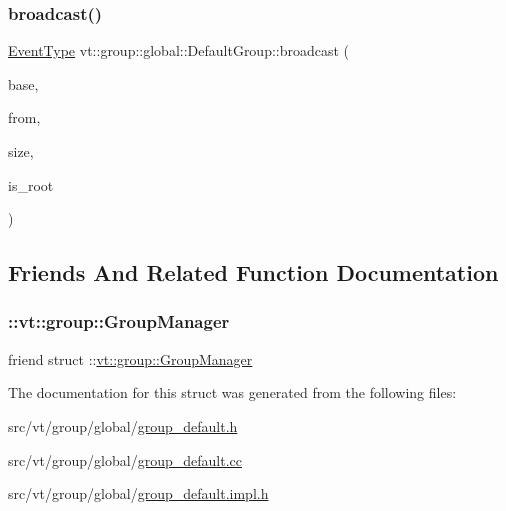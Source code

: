 \subsubsection{\texorpdfstring{broadcast()}{broadcast()}}
{\footnotesize\ttfamily \hyperlink{namespacevt_a009267401def7ae8bf201892222d060f}{Event\+Type} vt\+::group\+::global\+::\+Default\+Group\+::broadcast (\begin{DoxyParamCaption}\item[{\hyperlink{namespacevt_ab2b3d506ec8e8d1540aede826d84a239}{Msg\+Shared\+Ptr}$<$ \hyperlink{namespacevt_a44d0d4e144748f2b19a1cfd962f50338}{Base\+Msg\+Type} $>$ const \&}]{base,  }\item[{\hyperlink{namespacevt_a866da9d0efc19c0a1ce79e9e492f47e2}{Node\+Type} const \&}]{from,  }\item[{\hyperlink{namespacevt_abfa009d900299ac1df967b40ea8f2c8a}{Msg\+Size\+Type} const \&}]{size,  }\item[{bool const}]{is\+\_\+root }\end{DoxyParamCaption})\hspace{0.3cm}{\ttfamily [static]}}



\subsection{Friends And Related Function Documentation}
\mbox{\label{structvt_1_1group_1_1global_1_1_default_group_ab9d2dc7a29fd794bd88aff6d07f90527}} 
\subsubsection{\texorpdfstring{\+::vt\+::group\+::\+Group\+Manager}{::vt::group::GroupManager}}
{\footnotesize\ttfamily friend struct \+::\hyperlink{structvt_1_1group_1_1_group_manager}{vt\+::group\+::\+Group\+Manager}\hspace{0.3cm}{\ttfamily [friend]}}



The documentation for this struct was generated from the following files\+:\begin{DoxyCompactItemize}
\item 
src/vt/group/global/\hyperlink{group__default_8h}{group\+\_\+default.\+h}\item 
src/vt/group/global/\hyperlink{group__default_8cc}{group\+\_\+default.\+cc}\item 
src/vt/group/global/\hyperlink{group__default_8impl_8h}{group\+\_\+default.\+impl.\+h}\end{DoxyCompactItemize}

